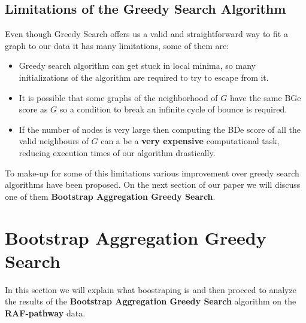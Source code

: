 \documentclass{article}
\begin{document}
	\subsection{Limitations of the Greedy Search Algorithm}
	Even though Greedy Search offers us a valid and straightforward way to fit a
	graph to our data it has many limitations, some of them are:
	\begin{itemize}
		\item Greedy search algorithm can get stuck in local minima, so many
			initializations of the algorithm are required to try to escape from it. 
		\item It is possible that some graphs of the neighborhood of $G$ have the
			same BGe score as $G$ so a condition to break an infinite cycle of bounce
			is required.
		\item If the number of nodes is very large then computing the BDe score of
			all the valid neighbours of $G$ can a be a \textbf{very expensive}
			computational task, reducing execution times of our algorithm
			drastically.
	\end{itemize}
	To make-up for some of this limitations various improvement over greedy
	search algorithms have been proposed\cite{bnsTechniques}. On the next section of our
	paper we will discuss one of them \textbf{Bootstrap Aggregation Greedy Search}.
	\section{Bootstrap Aggregation Greedy Search}
	In this section we will explain what boostraping is and then proceed to analyze the results of the \textbf{Bootstrap
	Aggregation Greedy Search} algorithm\cite{baggedBS1} on the \textbf{RAF-pathway} data.
\end{document}
